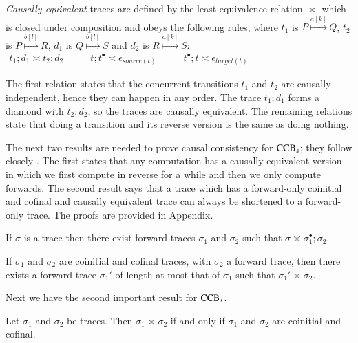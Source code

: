 \begin{definition}\label{def:causalequivalence} \normalfont \emph{Causally equivalent} traces are defined 
by the least equivalence relation $\asymp$ which is closed under composition and obeys the following rules, 
where $t_1$ is $P \stackrel{a[k]}{\longmapsto} Q$, $t_2$ is $P \stackrel{b[l]}{\longmapsto} R$, $d_1$ is $Q \stackrel{b[l]}{\longmapsto} S$ and $d_2$ is $R \stackrel{a[k]}{\longmapsto} S$:
\\[10pt]
$\begin{array}{lll}
	t_1;d_1 \asymp t_2;d_2 \qquad & t;t^\bullet \asymp \epsilon_{source(t)}\qquad & 
t^\bullet;t \asymp \epsilon_{target(t)}
\end{array}$
\end{definition}
The first relation states that the concurrent transitions $t_1$ and $t_2$
are causally independent, hence they can happen in any order. The trace $t_1;d_1$ forms a diamond
with $t_2;d_2$, so the traces are causally equivalent.
The remaining relations state that doing a transition and its reverse version is the same as doing nothing. 

The next two results are needed to prove causal consistency for ${\rm CCB}_s$; they follow
closely \cite{danos2004ccsr,LaneseMS10}. 
The first states that any computation has a causally equivalent version in
which we first compute in reverse for a while and then we only compute forwards. The second result 
says that a trace which has a forward-only coinitial and cofinal and causally equivalent trace can 
always be shortened to a forward-only trace. The proofs are provided in Appendix.
%
\begin{proposition}[Rearrangement]\label{prop:rearrange}
If $\sigma$ is a trace then there exist forward traces 
$\sigma_1$ and $\sigma_2$ such that $\sigma \asymp \sigma_1^\bullet;\sigma_2$.
\end{proposition}
%
\begin{proposition}[Shortening]\label{prop:shortening}
If $\sigma_1$ and $\sigma_2$ are coinitial and cofinal 
traces, with $\sigma_2$ a forward trace, then there exists a forward trace $\sigma_1'$ of length at most that 
of $\sigma_1$ such that $\sigma_1' \asymp \sigma_2$.
\end{proposition}
%
Next we have the second important result for ${\rm CCB}_s$.
%
\begin{thm}\label{prop:causcons}
Let $\sigma_1$ and $\sigma_2$ be traces. Then $\sigma_1 \asymp \sigma_2$ if and only if
$\sigma_1$ and $\sigma_2$ are coinitial and cofinal.
\end{thm}


